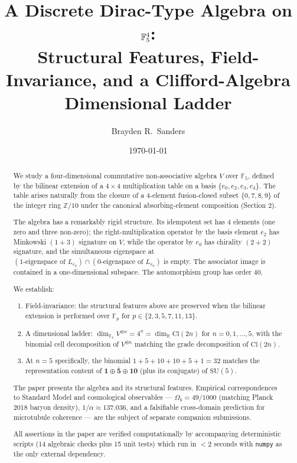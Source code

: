 \documentclass[11pt,reqno]{amsart}
\title[Discrete Dirac-type Algebra on $\F_5^4$]
{A Discrete Dirac-Type Algebra on $\F_5^4$: \\
 Structural Features, Field-Invariance, and a Clifford-Algebra Dimensional Ladder}
\author{Brayden R.\ Sanders}
\date{\today}
\theoremstyle{plain}
\theoremstyle{definition}
\theoremstyle{remark}
\newcommand{\Z}{\mathbb{Z}}
\newcommand{\F}{\mathbb{F}}
\newcommand{\R}{\mathbb{R}}
\newcommand{\Cl}{\mathrm{Cl}}
\begin{document}
\begin{abstract}
We study a four-dimensional commutative non-associative algebra $V$ over
$\F_5$, defined by the bilinear extension of a $4 \times 4$ multiplication
table on a basis $\{e_0, e_2, e_3, e_4\}$. The table arises naturally from
the closure of a 4-element fusion-closed subset $\{0,7,8,9\}$ of the integer
ring $\Z/10$ under the canonical absorbing-element composition (Section 2).

The algebra has a remarkably rigid structure. Its idempotent set has 4
elements (one zero and three non-zero); the right-multiplication operator
by the basis element $e_2$ has Minkowski $(1{+}3)$ signature on $V$, while
the operator by $e_0$ has chirality $(2{+}2)$ signature, and the
simultaneous eigenspace at $(\text{1-eigenspace of } L_{e_2}) \cap
(\text{0-eigenspace of } L_{e_0})$ is empty. The associator image is
contained in a one-dimensional subspace. The automorphism group has
order 40.

We establish:
\begin{enumerate}[label={(\arabic*)}]
\item Field-invariance: the structural features above are preserved when
the bilinear extension is performed over $\F_p$ for $p \in \{2,3,5,7,11,13\}$.
\item A dimensional ladder: $\dim_{\F_5} V^{\otimes n} = 4^n = \dim_\R \Cl(2n)$
for $n=0,1,\ldots,5$, with the binomial cell decomposition of $V^{\otimes n}$
matching the grade decomposition of $\Cl(2n)$.
\item At $n=5$ specifically, the binomial $1+5+10+10+5+1 = 32$ matches the
representation content of $\mathbf{1} \oplus \bar{\mathbf{5}} \oplus \mathbf{10}$
(plus its conjugate) of $\mathrm{SU}(5)$.
\end{enumerate}

The paper presents the algebra and its structural features. Empirical
correspondences to Standard Model and cosmological observables ---
$\Omega_b = 49/1000$ (matching Planck 2018 baryon density),
$1/\alpha \approx 137.036$, and a falsifiable cross-domain prediction
for microtubule coherence --- are the subject of separate companion
submissions.

All assertions in the paper are verified computationally by accompanying
deterministic scripts (14 algebraic checks plus 15 unit tests) which
run in $<2$ seconds with \texttt{numpy} as the only external dependency.
\end{abstract}

\maketitle
\end{document}
